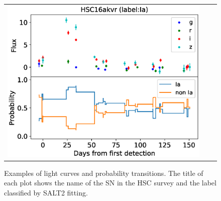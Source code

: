 \documentclass[useamsfonts]{pasj01}
\begin{document}
\begin{figure}[htbp]
\begin{tabular}{ccc}
\begin{minipage}{0.33\hsize}
\begin{center}
            \end{center}
        \end{minipage}
        \begin{minipage}{0.33\hsize}
            \begin{center}
                \includegraphics[width=\columnwidth]{figures/lcp_akvr.eps}
            \end{center}
        \end{minipage}
    \end{tabular}
    \vspace{3mm}
    \caption{%
    Examples of light curves and probability transitions. The title of each plot shows the name of the SN in the HSC survey and the label classified by SALT2 fitting.
    }%
    \label{fig:lcps}
\end{figure}
%
\end{document}
